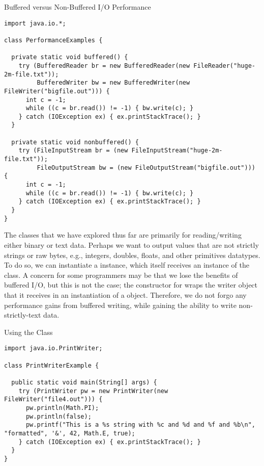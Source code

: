 \begin{cl}{Buffered versus Non-Buffered I/O Performance}
\begin{lstlisting}[language=MyJava]
import java.io.*;

class PerformanceExamples {
  
  private static void buffered() {
    try (BufferedReader br = new BufferedReader(new FileReader("huge-2m-file.txt"));
         BufferedWriter bw = new BufferedWriter(new FileWriter("bigfile.out"))) {
      int c = -1;
      while ((c = br.read()) != -1) { bw.write(c); }
    } catch (IOException ex) { ex.printStackTrace(); }
  }
  
  private static void nonbuffered() {
    try (FileInputStream br = (new FileInputStream("huge-2m-file.txt"));
         FileOutputStream bw = (new FileOutputStream("bigfile.out"))) {
      int c = -1;
      while ((c = br.read()) != -1) { bw.write(c); }
    } catch (IOException ex) { ex.printStackTrace(); }
  }
}
\end{lstlisting}
\end{cl}  

The classes that we have explored thus far are primarily for reading/writing either binary or text data. Perhaps we want to output values that are not strictly strings or raw bytes, e.g., integers, doubles, floats, and other primitives datatypes. To do so, we can instantiate a  instance, which itself receives an instance of the  class. A concern for some programmers may be that we lose the benefits of buffered I/O, but this is not the case; the constructor for  wraps the writer object that it receives in an instantiation of a  object. Therefore, we do not forgo any performance gains from buffered writing, while gaining the ability to write non-strictly-text data.


\begin{cl}{Using the  Class}
\begin{lstlisting}[language=MyJava]
import java.io.PrintWriter;

class PrintWriterExample {
  
  public static void main(String[] args) {
    try (PrintWriter pw = new PrintWriter(new FileWriter("file4.out"))) {
      pw.println(Math.PI);
      pw.println(false);
      pw.printf("This is a %s string with %c and %d and %f and %b\n", "formatted", '&', 42, Math.E, true);
    } catch (IOException ex) { ex.printStackTrace(); }
  }
}
\end{lstlisting}
\end{cl}

